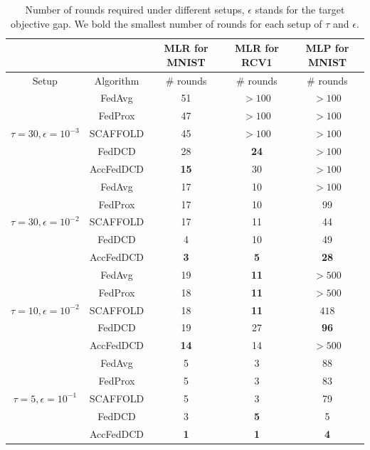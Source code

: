 \begin{table}[t]
    \centering
    \begin{tabular}{ccccc}
    \toprule
    & & MLR for MNIST& {MLR for RCV1} & {MLP for MNIST}  \\ \hline
    Setup & Algorithm & \# rounds  & \# rounds  & \# rounds \\  \cline{1-5}
    \multirow{5}{*}{$\tau=30, \epsilon=10^{-3}$} & FedAvg & 51 &  $>100$  & $>100$  \\ 
    & FedProx & 47  & $>100$  & $>100$ \\
    & SCAFFOLD & 45  & $>100$  & $>100$ \\
    & FedDCD & 28  & \textbf{24}  & $>100$ \\
    & AccFedDCD & \textbf{15} & 30  & $>100$ \\ \cline{2-5}
    \multirow{5}{*}{$\tau=30, \epsilon=10^{-2}$} & FedAvg & 17 &  10  & $>100$  \\ 
    & FedProx & 17  & 10  & 99 \\
    & SCAFFOLD & 17  & 11  & 44 \\
    & FedDCD & 4  & 10  & 49 \\
    & AccFedDCD & \textbf{3} & \textbf{5}  & \textbf{28} \\ \cline{2-5}
    \multirow{5}{*}{$\tau=10, \epsilon=10^{-2}$} & FedAvg & 19 &  \textbf{11}  & $>500$  \\ 
    & FedProx & 18  & \textbf{11}  & $>500$ \\
    & SCAFFOLD & 18  & \textbf{11}  & $418$ \\
    & FedDCD & 19  & 27  & \textbf{96} \\
    & AccFedDCD & \textbf{14} & 14  & $>500$ \\ \cline{2-5}
    \multirow{5}{*}{$\tau=5, \epsilon=10^{-1}$} & FedAvg & 5 &  3  & 88  \\ 
    & FedProx & 5  & 3  & 83 \\
    & SCAFFOLD & 5  & 3  & 79 \\
    & FedDCD & 3  & \textbf{5}  & 5 \\
    & AccFedDCD & \textbf{1} & \textbf{1}  & \textbf{4} 
    \\ \bottomrule
    \end{tabular}
    \caption{Number of rounds required under different setups, $\epsilon$ stands for the target objective gap. We bold the smallest number of rounds for each setup of $\tau$ and $\epsilon$.}  \label{tab:impactOfParticipationRate}
 \end{table}


